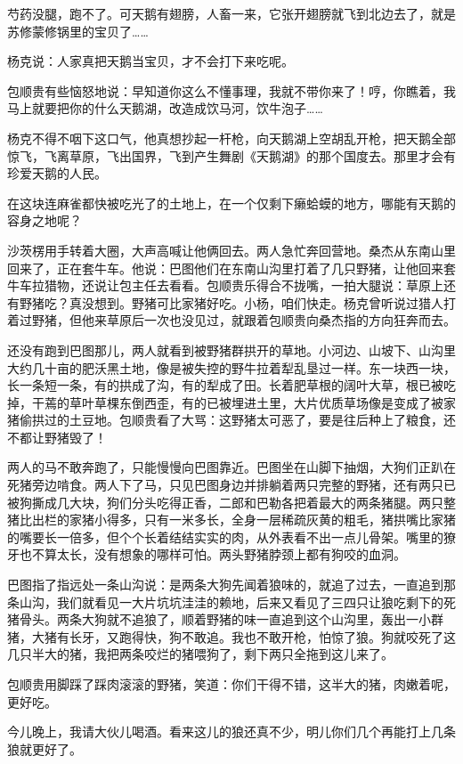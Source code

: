 \par 芍药没腿，跑不了。可天鹅有翅膀，人畜一来，它张开翅膀就飞到北边去了，就是苏修蒙修锅里的宝贝了……
\par 杨克说：人家真把天鹅当宝贝，才不会打下来吃呢。
\par 包顺贵有些恼怒地说：早知道你这么不懂事理，我就不带你来了！哼，你瞧着，我马上就要把你的什么天鹅湖，改造成饮马河，饮牛泡子……
\par 杨克不得不咽下这口气，他真想抄起一杆枪，向天鹅湖上空胡乱开枪，把天鹅全部惊飞，飞离草原，飞出国界，飞到产生舞剧《天鹅湖》的那个国度去。那里才会有珍爱天鹅的人民。
\par 在这块连麻雀都快被吃光了的土地上，在一个仅剩下癞蛤蟆的地方，哪能有天鹅的容身之地呢？
\par 沙茨楞用手转着大圈，大声高喊让他俩回去。两人急忙奔回营地。桑杰从东南山里回来了，正在套牛车。他说：巴图他们在东南山沟里打着了几只野猪，让他回来套牛车拉猎物，还说让包主任去看看。包顺贵乐得合不拢嘴，一拍大腿说：草原上还有野猪吃？真没想到。野猪可比家猪好吃。小杨，咱们快走。杨克曾听说过猎人打着过野猪，但他来草原后一次也没见过，就跟着包顺贵向桑杰指的方向狂奔而去。
\par 还没有跑到巴图那儿，两人就看到被野猪群拱开的草地。小河边、山坡下、山沟里大约几十亩的肥沃黑土地，像是被失控的野牛拉着犁乱垦过一样。东一块西一块，长一条短一条，有的拱成了沟，有的犁成了田。长着肥草根的阔叶大草，根已被吃掉，干蔫的草叶草棵东倒西歪，有的已被埋进土里，大片优质草场像是变成了被家猪偷拱过的土豆地。包顺贵看了大骂：这野猪太可恶了，要是往后种上了粮食，还不都让野猪毁了！
\par 两人的马不敢奔跑了，只能慢慢向巴图靠近。巴图坐在山脚下抽烟，大狗们正趴在死猪旁边啃食。两人下了马，只见巴图身边并排躺着两只完整的野猪，还有两只已被狗撕成几大块，狗们分头吃得正香，二郎和巴勒各把着最大的两条猪腿。两只整猪比出栏的家猪小得多，只有一米多长，全身一层稀疏灰黄的粗毛，猪拱嘴比家猪的嘴要长一倍多，但个个长着结结实实的肉，从外表看不出一点儿骨架。嘴里的獠牙也不算太长，没有想象的哪样可怕。两头野猪脖颈上都有狗咬的血洞。
\par 巴图指了指远处一条山沟说：是两条大狗先闻着狼味的，就追了过去，一直追到那条山沟，我们就看见一大片坑坑洼洼的赖地，后来又看见了三四只让狼吃剩下的死猪骨头。两条大狗就不追狼了，顺着野猪的味一直追到这个山沟里，轰出一小群猪，大猪有长牙，又跑得快，狗不敢追。我也不敢开枪，怕惊了狼。狗就咬死了这几只半大的猪，我把两条咬烂的猪喂狗了，剩下两只全拖到这儿来了。
\par 包顺贵用脚踩了踩肉滚滚的野猪，笑道：你们干得不错，这半大的猪，肉嫩着呢，更好吃。
\par 今儿晚上，我请大伙儿喝酒。看来这儿的狼还真不少，明儿你们几个再能打上几条狼就更好了。
